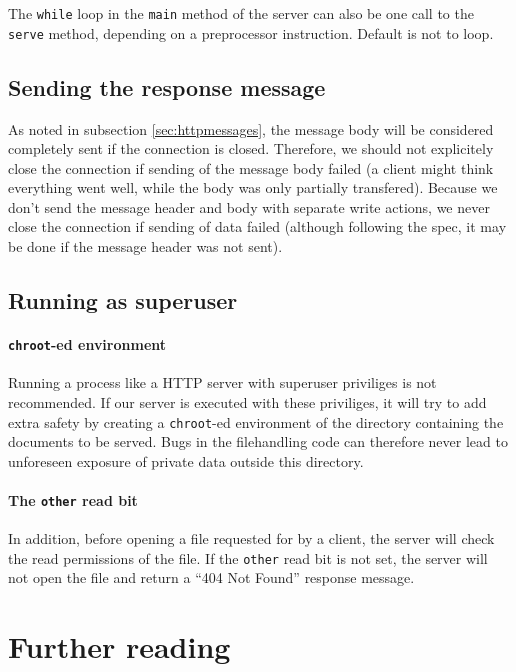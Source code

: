 \documentclass[11pt]{article}
\begin{document}
The \lstinline|while| loop in the \lstinline|main| method of the server can
also be one call to the \lstinline|serve| method, depending on a preprocessor
instruction. Default is not to loop.


\subsection{Sending the response message}

As noted in subsection \ref{sec:httpmessages}, the message body will be
considered completely sent if the connection is closed. Therefore, we should
not explicitely close the connection if sending of the message body
failed (a client might think everything went well, while the body was only
partially transfered). Because we don't send the message header and body with
separate write actions, we never close the connection if sending of data
failed (although following the spec, it may be done if the message header was
not sent).


\subsection{Running as superuser}

\paragraph{\lstinline|chroot|-ed environment}

Running a process like a HTTP server with superuser priviliges is not
recommended. If our server is executed with these priviliges, it will try to
add extra safety by creating a \lstinline|chroot|-ed environment of the
directory containing the documents to be served. Bugs in the filehandling code
can therefore never lead to unforeseen exposure of private data outside this
directory.

\paragraph{The \lstinline|other| read bit}

In addition, before opening a file requested for by a client, the server will
check the read permissions of the file. If the \lstinline|other| read bit is
not set, the server will not open the file and return a ``404 Not Found''
response message.

\section{Further reading}
\end{document}
